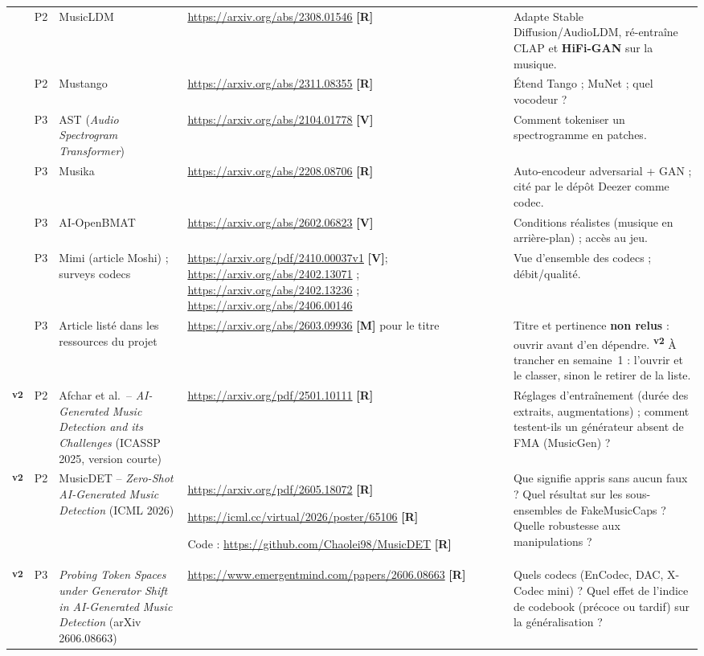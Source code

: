 \documentclass[11pt,a4paper]{article}
\providecommand{\og}{\guillemotleft\nobreakspace}%
\providecommand{\fg}{\nobreakspace\guillemotright}}
\newcommand{\vtwo}{\textsuperscript{\textcolor{orange!80!black}{\textbf{v2}}}}
\newcommand{\lV}{\textbf{\textcolor{green!45!black}{[V]}}}
\newcommand{\lR}{\textbf{\textcolor{orange!80!black}{[R]}}}
\newcommand{\lM}{\textbf{\textcolor{red!70!black}{[M]}}}
\begin{document}
{\begin{longtable}{L{0.6cm}L{0.9cm}L{3.9cm}L{4.5cm}L{5.0cm}}
 & P2 & MusicLDM & \url{https://arxiv.org/abs/2308.01546} \lR & Adapte Stable Diffusion/AudioLDM, ré-entraîne CLAP et \textbf{HiFi-GAN} sur la musique.\\
 & P2 & Mustango & \url{https://arxiv.org/abs/2311.08355} \lR & Étend Tango ; MuNet ; quel vocodeur ?\\
 & P3 & AST (\emph{Audio Spectrogram Transformer}) & \url{https://arxiv.org/abs/2104.01778} \lV & Comment tokeniser un spectrogramme en patches.\\
 & P3 & Musika & \url{https://arxiv.org/abs/2208.08706} \lR & Auto-encodeur adversarial + GAN ; cité par le dépôt Deezer comme codec.\\
 & P3 & AI-OpenBMAT & \url{https://arxiv.org/abs/2602.06823} \lV & Conditions réalistes (musique en arrière-plan) ; accès au jeu.\\
 & P3 & Mimi (article Moshi) ; surveys codecs & \url{https://arxiv.org/pdf/2410.00037v1} \lV ; \url{https://arxiv.org/abs/2402.13071} ; \url{https://arxiv.org/abs/2402.13236} ; \url{https://arxiv.org/abs/2406.00146} & Vue d'ensemble des codecs ; débit/qualité.\\
 & P3 & Article listé dans les ressources du projet & \url{https://arxiv.org/abs/2603.09936} \lM{} pour le titre & Titre et pertinence \textbf{non relus} : ouvrir avant d'en dépendre. \vtwo{} À trancher en semaine~1 : l'ouvrir et le classer, sinon le retirer de la liste.\\
\vtwo & P2 & Afchar et al.\ -- \emph{AI-Generated Music Detection and its Challenges} (ICASSP 2025, version courte) & \url{https://arxiv.org/pdf/2501.10111} \lR & Réglages d'entraînement (durée des extraits, augmentations) ; comment testent-ils un générateur absent de FMA (MusicGen) ?\\
\vtwo & P2 & MusicDET -- \emph{Zero-Shot AI-Generated Music Detection} (ICML 2026) & \url{https://arxiv.org/pdf/2605.18072} \lR\par \url{https://icml.cc/virtual/2026/poster/65106} \lR\par Code : \url{https://github.com/Chaolei98/MusicDET} \lR & Que signifie \og{}appris sans aucun faux\fg{} ? Quel résultat sur les sous-ensembles de FakeMusicCaps ? Quelle robustesse aux manipulations ?\\
\vtwo & P3 & \emph{Probing Token Spaces under Generator Shift in AI-Generated Music Detection} (arXiv 2606.08663) & \url{https://www.emergentmind.com/papers/2606.08663} \lR & Quels codecs (EnCodec, DAC, X-Codec mini) ? Quel effet de l'indice de codebook (précoce ou tardif) sur la généralisation ?\\

\end{longtable}}
\end{document}
